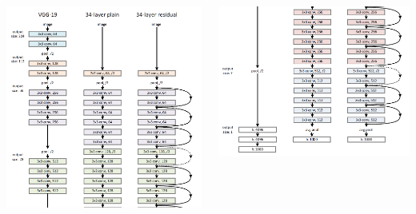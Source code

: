 \begin{frame}[allowframebreaks]
\begin{columns}
	\begin{column}{.5\textwidth}
		\begin{center}
			\includegraphics[scale=0.5]{figs/ResNet_zoom1}
		\end{center}
	\end{column}




	\begin{column}{.5\textwidth}
		\begin{center}
			\includegraphics[scale=0.5]{figs/ResNet_zoom2}
		\end{center}
	\end{column}%
\end{columns}



\end{frame}




